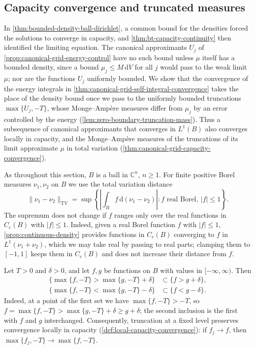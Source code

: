 \subsection{Capacity convergence and truncated measures}
\label{sec:canonical-grid-capacity-convergence}
In \cref{thm:bounded-density-ball-dirichlet}, a common bound for the densities forced the solutions to converge in capacity, and \cref{thm:bt-capacity-continuity} then identified the limiting equation. The canonical approximants $U_j$ of \cref{prop:canonical-grid-energy-control} have no such bound unless $\mu$ itself has a bounded density, since a bound $\mu_j\leq M\,\mathrm dV$ for all $j$ would pass to the weak limit $\mu$; nor are the functions $U_j$ uniformly bounded. We show that the convergence of the energy integrals in \cref{thm:canonical-grid-self-integral-convergence} takes the place of the density bound once we pass to the uniformly bounded truncations $\max\{U_j,-T\}$, whose Monge--Amp\`ere measures differ from $\mu_j$ by an error controlled by the energy (\cref{lem:zero-boundary-truncation-mass}). Thus a subsequence of canonical approximants that converges in $L^1(B)$ also converges locally in capacity, and the Monge--Amp\`ere measures of the truncations of its limit approximate $\mu$ in total variation (\cref{thm:canonical-grid-capacity-convergence}).

As throughout this section, $B$ is a ball in $\mathbb C^n$, $n\geq1$. For finite positive Borel measures $\nu_1,\nu_2$ on $B$ we use the total variation distance
\[
 \|\nu_1-\nu_2\|_{\mathrm{TV}}
 =\sup\left\{\left|\int_Bf\,\mathrm d(\nu_1-\nu_2)\right|:
                   f\text{ real Borel},\ |f|\leq1\right\}.
\]
The supremum does not change if $f$ ranges only over the real functions in $C_c(B)$ with $|f|\leq1$. Indeed, given a real Borel function $f$ with $|f|\leq1$, \cref{prop:continuous-density} provides functions in $C_c(B)$ converging to $f$ in $L^1(\nu_1+\nu_2)$, which we may take real by passing to real parts; clamping them to $[-1,1]$ keeps them in $C_c(B)$ and does not increase their distance from $f$.

Let $T>0$ and $\delta>0$, and let $f,g$ be functions on $B$ with values in $[-\infty,\infty)$. Then
\begin{equation}\label{eq:truncation-level-inclusions}
 \begin{aligned}
 \bigl\{\max\{f,-T\}>\max\{g,-T\}+\delta\bigr\}&\subset\{f>g+\delta\},\\
 \bigl\{\max\{f,-T\}<\max\{g,-T\}-\delta\bigr\}&\subset\{f<g-\delta\}.
 \end{aligned}
\end{equation}
Indeed, at a point of the first set we have $\max\{f,-T\}>-T$, so $f=\max\{f,-T\}>\max\{g,-T\}+\delta\geq g+\delta$; the second inclusion is the first with $f$ and $g$ interchanged. Consequently, truncation at a fixed level preserves convergence locally in capacity (\cref{def:local-capacity-convergence}): if $f_j\to f$, then $\max\{f_j,-T\}\to\max\{f,-T\}$.

